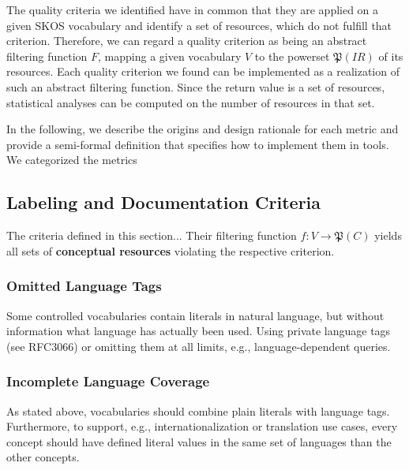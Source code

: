 The quality criteria we identified have in common that they are applied on a given SKOS vocabulary and identify a set of resources, which do not fulfill that criterion. Therefore, we can regard a quality criterion as being an abstract filtering function $F$, mapping a given vocabulary $V$ to the powerset $\mathfrak{P}(IR)$ of its resources. Each quality criterion we found can be implemented as a realization of such an abstract filtering function. Since the return value is a set of resources, statistical analyses can be computed on the number of resources in that set.


In the following, we describe the origins and design rationale for each metric and provide a semi-formal definition that specifies how to implement them in tools. We categorized the metrics 


\subsection{Labeling and Documentation Criteria}
The criteria defined in this section... Their filtering function \(f:V \rightarrow \mathfrak{P}(C)\) yields all sets of \textbf{conceptual resources} violating the respective criterion.

\subsubsection{Omitted Language Tags}
Some controlled vocabularies contain literals in natural language, but without information what language has actually been used. Using private language tags (see RFC3066) or omitting them at all limits, e.g., language-dependent queries.

\subsubsection{Incomplete Language Coverage}
As stated above, vocabularies should combine plain literals with language tags. Furthermore, to support, e.g., internationalization or translation use cases, every concept should have defined literal values in the same set of languages than the other concepts.

